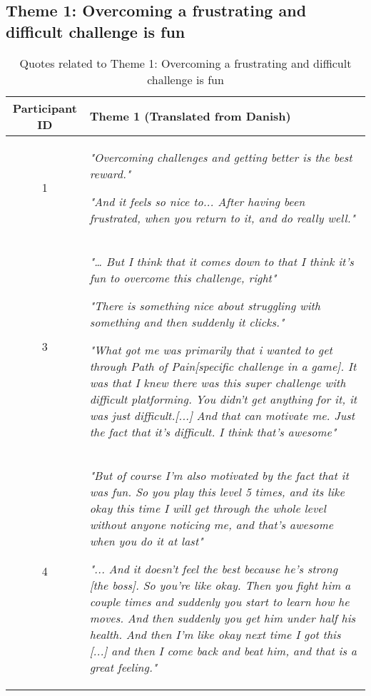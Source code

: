 \subsection{Theme 1: Overcoming a frustrating and difficult challenge is fun}\label{Theme 1}
\begin{table}[H]

\centering
\begin{tabular}{@{}c p{11cm}@{}}
\toprule
\textbf{Participant ID} & \textbf{Theme 1} (Translated from Danish)\\
\midrule

1 & \textit{"Overcoming challenges and getting better is the best reward."}

\vspace{0.3cm}

\textit{"And it feels so nice to... After having been frustrated, when you return to it, and do really well."}\\

\midrule

3& \textit{"… But I think that it comes down to that I think it's fun to overcome this challenge, right"}

\vspace{0.3cm}

\textit{"There is something nice about struggling with something and then suddenly it clicks."}

\vspace{0.3cm}

\textit{"What got me was primarily that i wanted to get through Path of Pain[specific challenge in a game]. It was that I knew there was this super challenge with difficult platforming. You didn't get anything for it, it was just difficult.[...] And that can motivate me. Just the fact that it's difficult. I think that's awesome"}\\

\midrule

4& \textit{"But of course I'm also motivated by the fact that it was fun. So you play this level 5 times, and its like okay this time I will get through the whole level without anyone noticing me, and that's awesome when you do it at last"}

\vspace{0.3cm}

\textit{"... And it doesn't feel the best because he's strong [the boss]. So you're like okay. Then you fight him a couple times and suddenly you start to learn how he moves. And then suddenly you get him under half his health. And then I'm like okay next time I got this [...] and then I come back and beat him, and that is a great feeling."}\\

\bottomrule
\end{tabular}

\caption{Quotes related to Theme 1: Overcoming a frustrating and difficult challenge is fun}
\label{tab:theme1-quotes}
\end{table}

